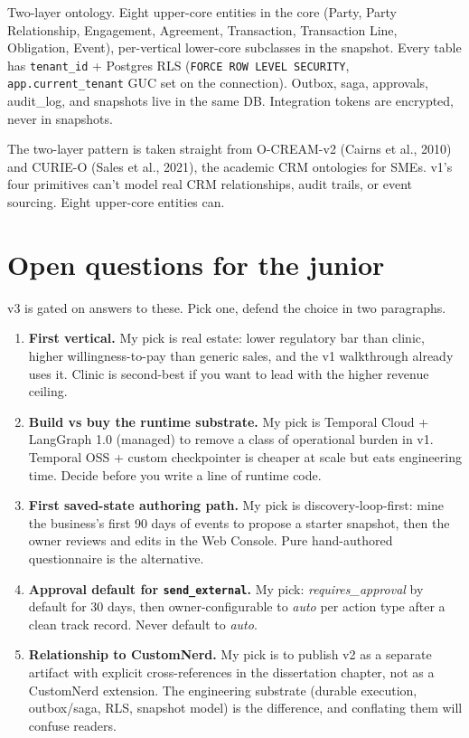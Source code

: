 \documentclass[11pt,a4paper]{article}
\begin{document}
Two-layer ontology. Eight upper-core entities in the core (Party, Party
Relationship, Engagement, Agreement, Transaction, Transaction Line,
Obligation, Event), per-vertical lower-core subclasses in the snapshot.
Every table has \texttt{tenant\_id} + Postgres RLS
(\texttt{FORCE ROW LEVEL SECURITY}, \texttt{app.current\_tenant} GUC
set on the connection). Outbox, saga, approvals, audit\_log, and
snapshots live in the same DB. Integration tokens are encrypted, never
in snapshots.

The two-layer pattern is taken straight from O-CREAM-v2 (Cairns et
al., 2010) and CURIE-O (Sales et al., 2021), the academic CRM
ontologies for SMEs. v1's four primitives can't model real CRM
relationships, audit trails, or event sourcing. Eight upper-core
entities can.

\section{Open questions for the junior}

v3 is gated on answers to these. Pick one, defend the choice in two
paragraphs.

\begin{enumerate}[leftmargin=*,itemsep=3pt]
  \item \textbf{First vertical.} My pick is real estate: lower regulatory
        bar than clinic, higher willingness-to-pay than generic sales,
        and the v1 walkthrough already uses it. Clinic is second-best
        if you want to lead with the higher revenue ceiling.
  \item \textbf{Build vs buy the runtime substrate.} My pick is Temporal
        Cloud + LangGraph 1.0 (managed) to remove a class of operational
        burden in v1. Temporal OSS + custom checkpointer is cheaper at
        scale but eats engineering time. Decide before you write a line
        of runtime code.
  \item \textbf{First saved-state authoring path.} My pick is
        discovery-loop-first: mine the business's first 90 days of
        events to propose a starter snapshot, then the owner reviews and
        edits in the Web Console. Pure hand-authored questionnaire is
        the alternative.
  \item \textbf{Approval default for \texttt{send\_external}.}
        My pick: \emph{requires\_approval} by default for 30 days, then
        owner-configurable to \emph{auto} per action type after a clean
        track record. Never default to \emph{auto}.
  \item \textbf{Relationship to CustomNerd.} My pick is to publish v2 as
        a separate artifact with explicit cross-references in the
        dissertation chapter, not as a CustomNerd extension. The
        engineering substrate (durable execution, outbox/saga, RLS,
        snapshot model) is the difference, and conflating them will
        confuse readers.
\end{enumerate}
\end{document}

